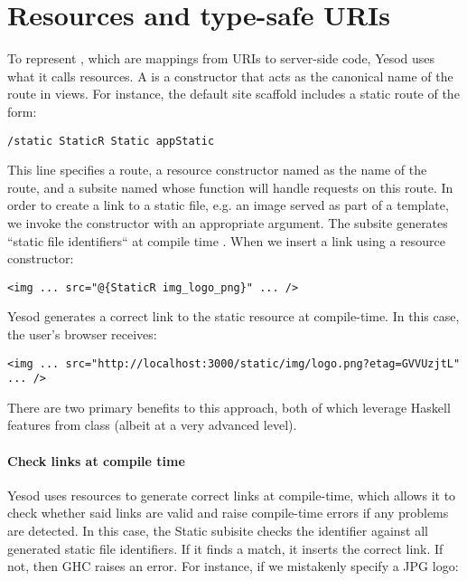 \section{Resources and type-safe URIs}

To represent , which are mappings from URIs to server-side code, Yesod uses what it calls resources. A  is a  constructor that acts as the canonical name of the route in views. For instance, the default site scaffold includes a static route of the form:

\begin{Verbatim}
/static StaticR Static appStatic
\end{Verbatim}

This line specifies a  route, a resource constructor named  as the name of the route, and a subsite named  whose function  will handle requests on this route. In order to create a link to a static file, e.g. an image served as part of a template, we invoke the  constructor with an appropriate argument. The  subsite generates ``static file identifiers`` at compile time \cite{ybk}. When we insert a link using a resource constructor:

\begin{Verbatim}
<img ... src="@{StaticR img_logo_png}" ... />
\end{Verbatim}

Yesod generates a correct link to the static resource at compile-time. In this case, the user's browser receives:

\begin{Verbatim}
<img ... src="http://localhost:3000/static/img/logo.png?etag=GVVUzjtL" ... />
\end{Verbatim}

There are two primary benefits to this approach, both of which leverage Haskell features from class (albeit at a very advanced level).

\paragraph{Check links at compile time} Yesod uses resources to generate correct links at compile-time, which allows it to check whether said links are valid and raise compile-time errors if any problems are detected. In this case, the Static subisite checks the identifier  against all generated static file identifiers. If it finds a match, it inserts the correct link. If not, then GHC raises an error. For instance, if we mistakenly specify a JPG logo:

